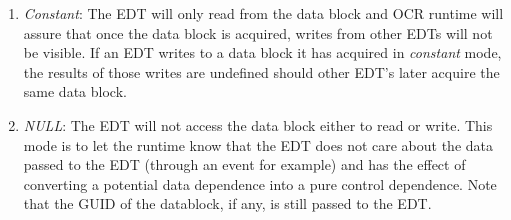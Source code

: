 \begin{enumerate}
\item \emph{Constant}: The EDT will only
  read from the data block and OCR runtime will assure that once the
  data block is acquired, writes from other EDTs will not be visible.
  If an EDT writes to a data block it has acquired in \emph{constant} mode,
  the results of those writes are undefined should other EDT's later
  acquire the same data block.
\item \emph{NULL}: The EDT will not access
  the data block either to read or write. This mode is to let the runtime
  know that the EDT does not care about the data passed to the EDT (through
  an event for example) and has the effect of converting a potential data dependence
  into a pure control dependence. Note that the GUID of the datablock, if any, is
  still passed to the EDT.
\end{enumerate}

